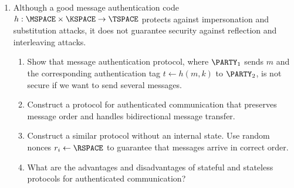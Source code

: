 \documentclass{article}
\begin{document}
\begin{enumerate}
\item Although a good message authentication code
  $h:\MSPACE\times\KSPACE\to\TSPACE$ protects against impersonation
  and substitution attacks, it does not guarantee security against
  reflection and interleaving attacks.
  \begin{enumerate}
  \item Show that message authentication protocol, where $\PARTY_1$
    sends $m$ and the corresponding authentication tag $t\gets h(m,k)$
    to $\PARTY_2$, is not secure if we want to send several messages.
  \item Construct a protocol for authenticated communication that
    preserves message order and handles bidirectional message
    transfer.
  \item Construct a similar protocol without an internal state. Use
    random nonces $r_i\gets\RSPACE$ to guarantee that messages arrive
    in correct order.
  \item What are the advantages and disadvantages of stateful and
    stateless protocols for authenticated communication?
  \end{enumerate}


\end{enumerate}
\end{document}
